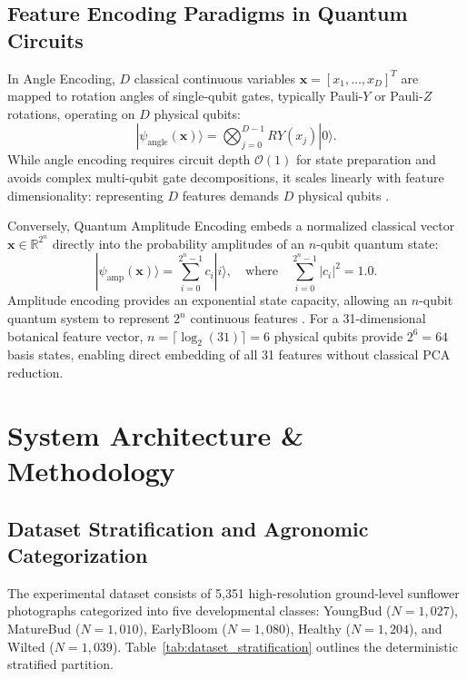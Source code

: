 \documentclass{ieeeaccess}
\begin{document}
\subsection{Feature Encoding Paradigms in Quantum Circuits}
In Angle Encoding, $D$ classical continuous variables $\mathbf{x} = [x_1, \dots, x_D]^T$ are mapped to rotation angles of single-qubit gates, typically Pauli-$Y$ or Pauli-$Z$ rotations, operating on $D$ physical qubits:
\begin{equation}
    |\psi_{\text{angle}}(\mathbf{x})\rangle = \bigotimes_{j=0}^{D-1} RY(x_j)|0\rangle.
\end{equation}
While angle encoding requires circuit depth $\mathcal{O}(1)$ for state preparation and avoids complex multi-qubit gate decompositions, it scales linearly with feature dimensionality: representing $D$ features demands $D$ physical qubits \cite{lloyd2013quantum}.

Conversely, Quantum Amplitude Encoding embeds a normalized classical vector $\mathbf{x} \in \mathbb{R}^{2^n}$ directly into the probability amplitudes of an $n$-qubit quantum state:
\begin{equation}
    |\psi_{\text{amp}}(\mathbf{x})\rangle = \sum_{i=0}^{2^n - 1} c_i |i\rangle, \quad \text{where} \quad \sum_{i=0}^{2^n - 1} |c_i|^2 = 1.0.
\end{equation}
Amplitude encoding provides an exponential state capacity, allowing an $n$-qubit quantum system to represent $2^n$ continuous features \cite{schuld2021supervised}. For a 31-dimensional botanical feature vector, $n = \lceil \log_2(31) \rceil = 6$ physical qubits provide $2^6 = 64$ basis states, enabling direct embedding of all 31 features without classical PCA reduction.

\section{System Architecture \& Methodology}
\label{sec:methodology}

\subsection{Dataset Stratification and Agronomic Categorization}
The experimental dataset consists of 5,351 high-resolution ground-level sunflower photographs categorized into five developmental classes: YoungBud ($N = 1,027$), MatureBud ($N = 1,010$), EarlyBloom ($N = 1,080$), Healthy ($N = 1,204$), and Wilted ($N = 1,039$). Table~\ref{tab:dataset_stratification} outlines the deterministic stratified partition.
\end{document}
